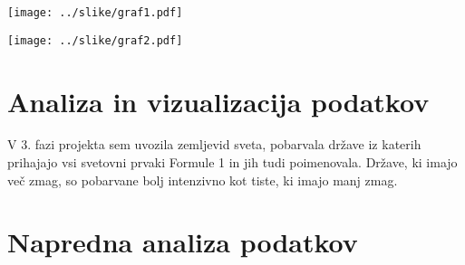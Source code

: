 \documentclass[11pt,a4paper]{article}
\begin{document}
\texttt{[image: ../slike/graf1.pdf]}

\texttt{[image: ../slike/graf2.pdf]}

\section{Analiza in vizualizacija podatkov}

V 3. fazi projekta sem uvozila zemljevid sveta, pobarvala države iz katerih prihajajo vsi svetovni prvaki Formule 1 in jih tudi poimenovala. Države, ki imajo več zmag, so pobarvane bolj intenzivno kot tiste, ki imajo manj zmag. 



\section{Napredna analiza podatkov}

\end{document}
